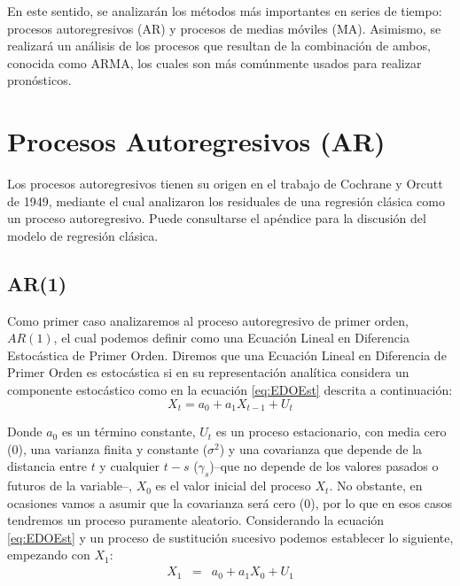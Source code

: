 \documentclass[
]{book}
\begin{document}
En este sentido, se analizarán los métodos más importantes en series de tiempo: procesos autoregresivos (AR) y procesos de medias móviles (MA). Asimismo, se realizará un análisis de los procesos que resultan de la combinación de ambos, conocida como ARMA, los cuales son más comúnmente usados para realizar pronósticos.

\hypertarget{procesos-autoregresivos-ar}{%
\section{Procesos Autoregresivos (AR)}\label{procesos-autoregresivos-ar}}

Los procesos autoregresivos tienen su origen en el trabajo de Cochrane y Orcutt de 1949, mediante el cual analizaron los residuales de una regresión clásica como un proceso autoregresivo. Puede consultarse el apéndice para la discusión del modelo de regresión clásica.

\hypertarget{ar1}{%
\subsection{AR(1)}\label{ar1}}

Como primer caso analizaremos al proceso autoregresivo de primer orden, \(AR(1)\), el cual podemos definir como una Ecuación Lineal en Diferencia Estocástica de Primer Orden. Diremos que una Ecuación Lineal en Diferencia de Primer Orden es estocástica si en su representación analítica considera un componente estocástico como en la ecuación \eqref{eq:EDOEst} descrita a continuación:
\begin{equation}
    X_t = a_0 + a_1 X_{t-1} + U_t
    \label{eq:EDOEst}
\end{equation}

Donde \(a_0\) es un término constante, \(U_t\) es un proceso estacionario, con media cero (0), una varianza finita y constante (\(\sigma^2\)) y una covarianza que depende de la distancia entre \(t\) y cualquier \(t-s\) (\(\gamma_s\))--que no depende de los valores pasados o futuros de la variable--, \(X_0\) es el valor inicial del proceso \(X_t\). No obstante, en ocasiones vamos a asumir que la covarianza será cero (0), por lo que en esos casos tendremos un proceso puramente aleatorio. Considerando la ecuación \eqref{eq:EDOEst} y un proceso de sustitución sucesivo podemos establecer lo siguiente, empezando con \(X_1\):
\begin{eqnarray*}
    X_{1} & = & a_0 + a_1 X_{0} + U_{1}
\end{eqnarray*}
\end{document}
